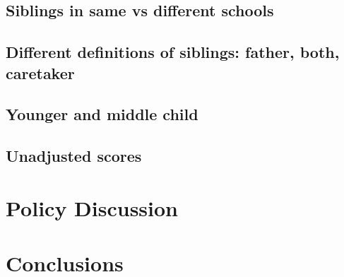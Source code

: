 \subsection{Siblings in same vs different schools}

\subsection{Different definitions of siblings: father, both, caretaker}

\subsection{Younger and middle child}

\subsection{Unadjusted scores}

\section{Policy Discussion}\label{sec:policy}

\section{Conclusions}\label{sec:conclusions}






